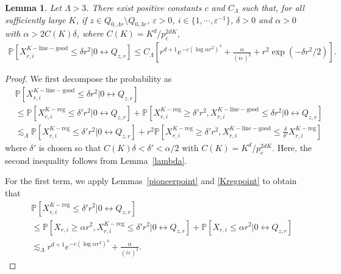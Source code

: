 \documentclass[11pt]{article}
\theoremstyle{definition}
\theoremstyle{remark}
\newcommand{\bP}{\mathbb{P}}
\numberwithin{equation}{section}
\theoremstyle{plain}
\newtheorem{lem}[theorem]{Lemma}
\theoremstyle{definition}
\theoremstyle{remark}
\theoremstyle{plain}
\begin{document}
\begin{lem}\label{KLgood}
Let $\Lambda>3$. There exist positive constants $c$ and $C_\Lambda$ such that, for all sufficiently large $K$, if $z \in Q_{0,\Lambda r}\setminus Q_{0,3r}$, $\varepsilon>0$, $i \in \{1, \cdots, \varepsilon^{-1}\}$, $\delta>0$ and $\alpha>0$ with $\alpha>2C(K)\delta$, where $C(K)=K^d/p_c^{2dK}$,
\begin{align*}
\mathbb {P}\left[X_{r,i}^{K-\mathrm{line-good}}\le \delta r^2| 0\leftrightarrow Q_{z,r}\right]\le C_{\Lambda}\left[r^{d+1}e^{-c(\log \alpha r^2)^4}+\frac{\alpha}{(i\varepsilon)^2}+ r^2\exp(-\delta r^2/2)\right].
\end{align*}
\end{lem}
\begin{proof}
We first decompose the probability as
\begin{align*}
&\bP[X_{r,i}^{K-\mathrm{line-good}}\le \delta r^2| 0 \leftrightarrow Q_{z,r}]\\
&\le \bP[X_{r,i}^{K-\mathrm{reg}}\le \delta' r^2| 0 \leftrightarrow Q_{z,r}]+\bP[X_{r,i}^{K-\mathrm{reg}}\ge \delta'r^2, X_{r,i}^{K-\mathrm{line-good}}\le \delta r^2| 0 \leftrightarrow Q_{z,r}]\\
&\lesssim_{\Lambda}\bP[X_{r,i}^{K-\mathrm{reg}}\le \delta' r^2| 0 \leftrightarrow Q_{z,r}]+r^2\bP[X_{r,i}^{K-\mathrm{reg}}\ge \delta'r^2, X_{r,i}^{K-\mathrm{line-good}}\le \frac{\delta}{\delta'} X_{r,i}^{K-\mathrm{reg}}]
\end{align*}
where $\delta'$ is chosen so that $C(K)\delta<\delta'<\alpha/2$ with $C(K)=K^d/p_c^{2dK}$. Here, the second inequality follows from Lemma~\ref{lambda}.

For the first term, we apply Lemmas~\ref{pioneerpoint} and \ref{Kregpoint} to obtain that
\begin{align*}
       &\bP[X_{r,i}^{K-\mathrm{reg}}\le \delta' r^2| 0 \leftrightarrow Q_{z,r}] \\
       &\le \bP[X_{r,i}\ge \alpha r^2,X_{r,i}^{K-\mathrm{reg}}\le \delta' r^2 | 0\leftrightarrow Q_{z,r}]+ \bP[X_{r,i}\le \alpha r^2| 0 \leftrightarrow Q_{z,r}]\\
       &\lesssim_{\Lambda} r^{d+1}e^{-c(\log \alpha r^2)^4}+\frac{\alpha}{(i\varepsilon)^2}.
    \end{align*}


\end{proof}
\end{document}
